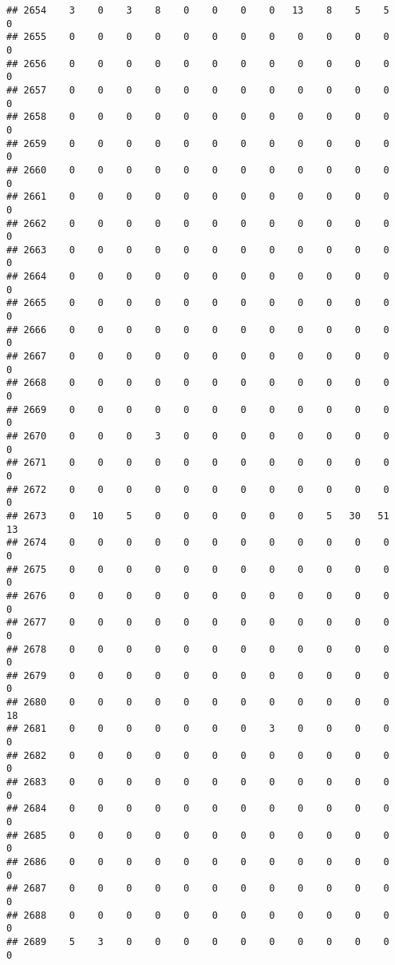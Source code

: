 \documentclass[]{article}
\begin{document}
\begin{verbatim}
## 2654    3    0    3    8    0    0    0    0   13    8    5    5    0
## 2655    0    0    0    0    0    0    0    0    0    0    0    0    0
## 2656    0    0    0    0    0    0    0    0    0    0    0    0    0
## 2657    0    0    0    0    0    0    0    0    0    0    0    0    0
## 2658    0    0    0    0    0    0    0    0    0    0    0    0    0
## 2659    0    0    0    0    0    0    0    0    0    0    0    0    0
## 2660    0    0    0    0    0    0    0    0    0    0    0    0    0
## 2661    0    0    0    0    0    0    0    0    0    0    0    0    0
## 2662    0    0    0    0    0    0    0    0    0    0    0    0    0
## 2663    0    0    0    0    0    0    0    0    0    0    0    0    0
## 2664    0    0    0    0    0    0    0    0    0    0    0    0    0
## 2665    0    0    0    0    0    0    0    0    0    0    0    0    0
## 2666    0    0    0    0    0    0    0    0    0    0    0    0    0
## 2667    0    0    0    0    0    0    0    0    0    0    0    0    0
## 2668    0    0    0    0    0    0    0    0    0    0    0    0    0
## 2669    0    0    0    0    0    0    0    0    0    0    0    0    0
## 2670    0    0    0    3    0    0    0    0    0    0    0    0    0
## 2671    0    0    0    0    0    0    0    0    0    0    0    0    0
## 2672    0    0    0    0    0    0    0    0    0    0    0    0    0
## 2673    0   10    5    0    0    0    0    0    0    5   30   51   13
## 2674    0    0    0    0    0    0    0    0    0    0    0    0    0
## 2675    0    0    0    0    0    0    0    0    0    0    0    0    0
## 2676    0    0    0    0    0    0    0    0    0    0    0    0    0
## 2677    0    0    0    0    0    0    0    0    0    0    0    0    0
## 2678    0    0    0    0    0    0    0    0    0    0    0    0    0
## 2679    0    0    0    0    0    0    0    0    0    0    0    0    0
## 2680    0    0    0    0    0    0    0    0    0    0    0    0   18
## 2681    0    0    0    0    0    0    0    3    0    0    0    0    0
## 2682    0    0    0    0    0    0    0    0    0    0    0    0    0
## 2683    0    0    0    0    0    0    0    0    0    0    0    0    0
## 2684    0    0    0    0    0    0    0    0    0    0    0    0    0
## 2685    0    0    0    0    0    0    0    0    0    0    0    0    0
## 2686    0    0    0    0    0    0    0    0    0    0    0    0    0
## 2687    0    0    0    0    0    0    0    0    0    0    0    0    0
## 2688    0    0    0    0    0    0    0    0    0    0    0    0    0
## 2689    5    3    0    0    0    0    0    0    0    0    0    0    0

\end{verbatim}
\end{document}
